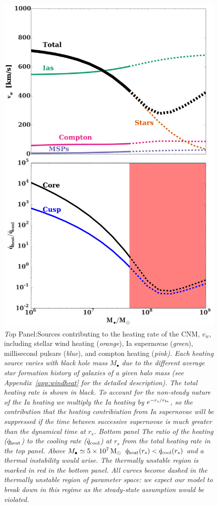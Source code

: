 \documentclass[usenatbib,fleqn]{mn2e}
\newcommand{\rs}{r_s}
\newcommand{\Mbh}[1][]{M_{\bullet#1}}
\newcommand{\rIa}{r_{\rm Ia}}
\newcommand{\vwO}{v_{w}}
\begin{document}
\begin{figure}
\includegraphics[width=\columnwidth]{vwSources.pdf}
\caption{\label{fig:vwSources} {\emph Top Panel:}Sources contributing
  to the heating rate of the CNM, $\vwO$, including stellar wind
  heating ({\it orange}), Ia supernovae ({\it green}), millisecond
  pulsars ({\it blue}), and compton heating (\it pink).  Each heating
  source varies with black hole mass $\Mbh$ due to the different
  average star formation history of galaxies of a given halo mass (see
  Appendix~\ref{app:windheat} for the detailed description). The total
  heating rate is shown in black. To account for the non-steady nature
  of the Ia heating we multiply the Ia heating by $e^{-\rs/\rIa}$, so
  the contribution that the heating contribiution from Ia supernovae
  will be suppressed if the time between successive supernovae is much
  greater than the dynamical time at $\rs$. {\emph Bottom panel} The
  ratio of the heating ($\dot{q}_{\rm heat}$) to the cooling rate
  ($\dot{q}_{\rm cool}$) at $\rs$ from the total heating rate in the
  top panel. Above $\Mbh\simeq 5\times 10^7 \Msun$ $\dot{q}_{\rm
    heat}(\rs)<\dot{q}_{\rm cool}(\rs)$ and a thermal instability
  would arise. The thermally unstable region is marked in red in the
  bottom panel. All curves become dashed in the thermally unstable
  region of parameter space: we expect our model to break down in this
  regime as the steady-state assumption would be violated.}
\end{figure}
\end{document}
